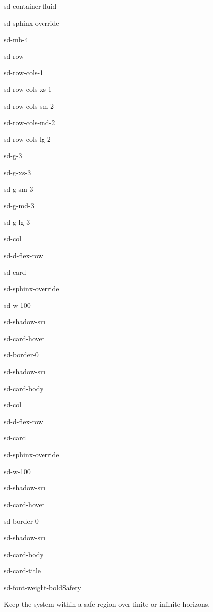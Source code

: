 \documentclass[a4paper,10pt,english]{sphinxmanual}
\begin{document}
\begin{sphinxuseclass}{sd-container-fluid}
\begin{sphinxuseclass}{sd-sphinx-override}
\begin{sphinxuseclass}{sd-mb-4}
\begin{sphinxuseclass}{sd-row}
\begin{sphinxuseclass}{sd-row-cols-1}
\begin{sphinxuseclass}{sd-row-cols-xs-1}
\begin{sphinxuseclass}{sd-row-cols-sm-2}
\begin{sphinxuseclass}{sd-row-cols-md-2}
\begin{sphinxuseclass}{sd-row-cols-lg-2}
\begin{sphinxuseclass}{sd-g-3}
\begin{sphinxuseclass}{sd-g-xs-3}
\begin{sphinxuseclass}{sd-g-sm-3}
\begin{sphinxuseclass}{sd-g-md-3}
\begin{sphinxuseclass}{sd-g-lg-3}
\begin{sphinxuseclass}{sd-col}
\begin{sphinxuseclass}{sd-d-flex-row}
\begin{sphinxuseclass}{sd-card}
\begin{sphinxuseclass}{sd-sphinx-override}
\begin{sphinxuseclass}{sd-w-100}
\begin{sphinxuseclass}{sd-shadow-sm}
\begin{sphinxuseclass}{sd-card-hover}
\begin{sphinxuseclass}{sd-border-0}
\begin{sphinxuseclass}{sd-shadow-sm}
\begin{sphinxuseclass}{sd-card-body}
\end{sphinxuseclass}{\hyperref[\detokenize{examples/reach-avoid::doc}]{}}
\end{sphinxuseclass}
\end{sphinxuseclass}
\end{sphinxuseclass}
\end{sphinxuseclass}
\end{sphinxuseclass}
\end{sphinxuseclass}
\end{sphinxuseclass}
\end{sphinxuseclass}
\end{sphinxuseclass}
\begin{sphinxuseclass}{sd-col}
\begin{sphinxuseclass}{sd-d-flex-row}
\begin{sphinxuseclass}{sd-card}
\begin{sphinxuseclass}{sd-sphinx-override}
\begin{sphinxuseclass}{sd-w-100}
\begin{sphinxuseclass}{sd-shadow-sm}
\begin{sphinxuseclass}{sd-card-hover}
\begin{sphinxuseclass}{sd-border-0}
\begin{sphinxuseclass}{sd-shadow-sm}
\begin{sphinxuseclass}{sd-card-body}
\begin{sphinxuseclass}{sd-card-title}
\begin{sphinxuseclass}{sd-font-weight-bold}Safety
\end{sphinxuseclass}
\end{sphinxuseclass}
\sphinxAtStartPar
Keep the system within a safe region over finite or infinite horizons.


\end{sphinxuseclass}
\end{sphinxuseclass}
\end{sphinxuseclass}
\end{sphinxuseclass}
\end{sphinxuseclass}
\end{sphinxuseclass}
\end{sphinxuseclass}
\end{sphinxuseclass}
\end{sphinxuseclass}
\end{sphinxuseclass}
\end{sphinxuseclass}
\end{sphinxuseclass}
\end{sphinxuseclass}
\end{sphinxuseclass}
\end{sphinxuseclass}
\end{sphinxuseclass}
\end{sphinxuseclass}
\end{sphinxuseclass}
\end{sphinxuseclass}
\end{sphinxuseclass}
\end{sphinxuseclass}
\end{sphinxuseclass}
\end{sphinxuseclass}
\end{sphinxuseclass}
\end{document}
